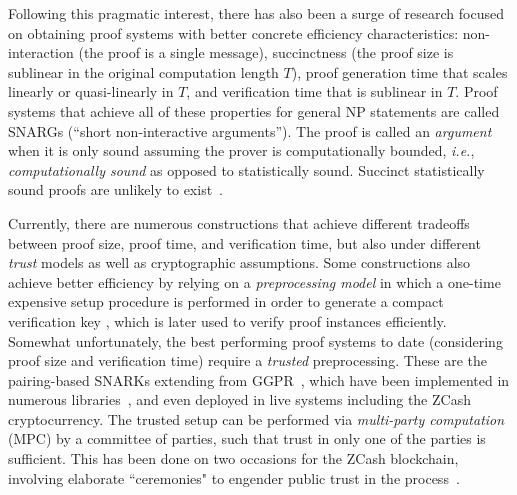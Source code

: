 Following this pragmatic interest, there has also been a surge of research focused on obtaining proof systems with better concrete efficiency characteristics: non-interaction (the proof is a single message), succinctness (the proof size is sublinear in the original computation length $T$), proof generation time that scales linearly or quasi-linearly in $T$, and verification time that is sublinear in $T$. Proof systems that achieve all of these properties for general NP statements%
are called SNARGs (``short non-interactive arguments''). 
The proof is called an \emph{argument} when it is only sound assuming the prover is computationally bounded, \emph{i.e.}, \emph{computationally sound} as opposed to statistically sound. 
Succinct statistically sound proofs are unlikely to exist~\cite{CC:GolVadWig02,ICALP:Wee05}. 

Currently, there are numerous constructions that achieve different tradeoffs between proof size, proof time, and verification time, but also under different \emph{trust} models as well as cryptographic assumptions. %
Some constructions also achieve better efficiency by relying on a \emph{preprocessing model} in which a one-time expensive setup procedure is performed in order to generate a compact verification key , which is later used to verify proof instances efficiently.
Somewhat unfortunately, the best performing proof systems to date (considering proof size and verification time) require a \emph{trusted} preprocessing. These are the pairing-based SNARKs extending from GGPR~\cite{EC:GGPR13,ES:SBVBPW13,TCC:BCIOP13,C:BCGTV13,EC:Groth16}, which have been implemented in numerous libraries~\cite{C:BCGTV13,bellman}, and even deployed in live systems including the ZCash~\cite{Zcash} cryptocurrency.
The trusted setup can be performed via \emph{multi-party computation} (MPC) by a committee of parties, such that trust in only one of the parties is sufficient. This has been done on two occasions for the ZCash blockchain, involving elaborate ``ceremonies" to engender public trust in the process~\cite{ZcashCeremony}. 

